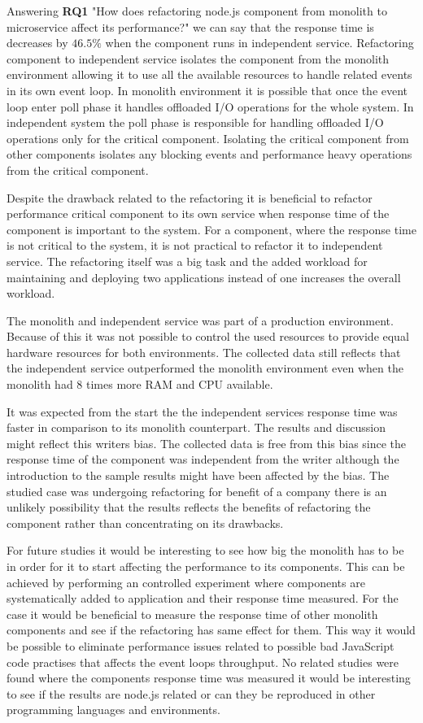Answering \textbf{RQ1} "How does refactoring node.js component from monolith to microservice affect its performance?" we can say that the response time is decreases by $46.5\%$ when the component runs in independent service.
Refactoring component to independent service isolates the component from the monolith environment allowing it to use all the available resources to handle related events in its own event loop.
In monolith environment it is possible that once the event loop enter poll phase it handles offloaded I/O operations for the whole system.
In independent system the poll phase is responsible for handling offloaded I/O operations only for the critical component.
Isolating the critical component from other components isolates any blocking events and performance heavy operations from the critical component.

Despite the drawback related to the refactoring it is beneficial to refactor performance critical component to its own service when response time of the component is important to the system.
For a component, where the response time is not critical to the system, it is not practical to refactor it to independent service.
The refactoring itself was a big task and the added workload for maintaining and deploying two applications instead of one increases the overall workload.

The monolith and independent service was part of a production environment.
Because of this it was not possible to control the used resources to provide equal hardware resources for both environments.
The collected data still reflects that the independent service outperformed the monolith environment even when the monolith had $8$ times more RAM and CPU available.

It was expected from the start the the independent services response time was faster in comparison to its monolith counterpart.
The results and discussion might reflect this writers bias.
The collected data is free from this bias since the response time of the component was independent from the writer although the introduction to the sample results might have been affected by the bias.
The studied case was undergoing refactoring for benefit of a company there is an unlikely possibility that the results reflects the benefits of refactoring the component rather than concentrating on its drawbacks.

For future studies it would be interesting to see how big the monolith has to be in order for it to start affecting the performance to its components.
This can be achieved by performing an controlled experiment where components are systematically added to application and their response time measured.
For the case it would be beneficial to measure the response time of other monolith components and see if the refactoring has same effect for them.
This way it would be possible to eliminate  performance issues related to possible bad JavaScript code practises that affects the event loops throughput.
No related studies were found where the components response time was measured it would be interesting to see if the results are node.js related or can they be reproduced in other programming languages and environments.
